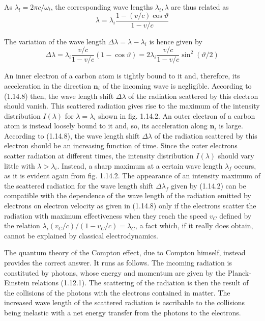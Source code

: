 \documentclass{article}
\begin{document}
As $\lambda_{l}=2 \pi c / \omega_{l}$, the corresponding wave lengths $\lambda_{i}, \lambda$ are thus related as
$$
\begin{equation*}
\lambda=\lambda_{i} \frac{1-(v / c) \cos \vartheta}{1-v / c} \tag{1.14.7}
\end{equation*}
$$

The variation of the wave length $\Delta \lambda=\lambda-\lambda_{i}$ is hence given by
$$
\begin{equation*}
\Delta \lambda=\lambda_{i} \frac{v / c}{1-v / c}(1-\cos \vartheta)=2 \lambda_{i} \frac{v / c}{1-v / c} \sin ^{2}(\vartheta / 2) \tag{1.14.8}
\end{equation*}
$$

An inner electron of a carbon atom is tightly bound to it and, therefore, its acceleration in the direction $\boldsymbol{n}_{i}$ of the incoming wave is negligible. According to (1.14.8) then, the wave length shift $\Delta \lambda$ of the radiation scattered by this electron should vanish. This scattered radiation gives rise to the maximum of the intensity distribution $I(\lambda)$ for $\lambda=\lambda_{i}$ shown in fig. 1.14.2. An outer electron of a carbon atom is instead loosely bound to it and, so, its acceleration along $\boldsymbol{n}_{i}$ is large. According to (1.14.8), the wave length shift $\Delta \lambda$ of the radiation scattered by this electron should be an increasing function of time. Since the outer electrons
scatter radiation at different times, the intensity distribution $I(\lambda)$ should vary little with $\lambda>\lambda_{i}$. Instead, a sharp maximum at a certain wave length $\lambda_{f}$ occurs, as it is evident again from fig. 1.14.2. The appearance of an intensity maximum of the scattered radiation for the wave length shift $\Delta \lambda_{f}$ given by (1.14.2) can be compatible with the dependence of the wave length of the radiation emitted by electrons on electron velocity as given in (1.14.8) only if the electrons scatter the radiation with maximum effectiveness when they reach the speed $v_{C}$ defined by the relation $\lambda_{i}\left(v_{C} / c\right) /\left(1-v_{C} / c\right)=\lambda_{C}$, a fact which, if it really does obtain, cannot be explained by classical electrodynamics.

The quantum theory of the Compton effect, due to Compton himself, instead provides the correct answer. It runs as follows. The incoming radiation is constituted by photons, whose energy and momentum are given by the Planck-Einstein relations (1.12.1). The scattering of the radiation is then the result of the collisions of the photons with the electrons contained in matter. The increased wave length of the scattered radiation is ascribable to the collisions being inelastic with a net energy transfer from the photons to the electrons.
\end{document}
